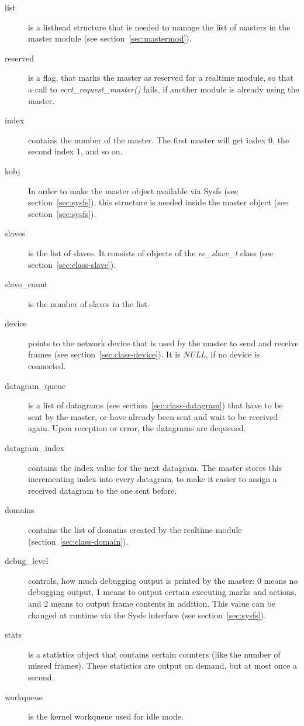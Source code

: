 \documentclass[a4paper,12pt,BCOR6mm,bibtotoc,idxtotoc]{scrbook}
\begin{document}
\begin{description}
\item[list] is a listhead structure that is needed to manage the list
  of masters in the master module (see section~\ref{sec:mastermod}).
\item[reserved] is a flag, that marks the master as reserved for a
  realtime module, so that a call to \textit{ecrt\_request\_master()}
  fails, if another module is already using the master.
\item[index] contains the number of the master. The first master will
  get index 0, the second index 1, and so on.
\item[kobj] In order to make the master object available via Sysfs
  (see section~\ref{sec:sysfs}), this structure is needed inside the
  master object (see section~\ref{sec:sysfs}).
\item[slaves] is the list of slaves. It consists of objects of the
  \textit{ec\_slave\_t} class (see section~\ref{sec:class-slave}).
\item[slave\_count] is the number of slaves in the list.
\item[device] points to the network device that is used by the master
  to send and receive frames (see section~\ref{sec:class-device}). It
  is \textit{NULL}, if no device is connected.
\item[datagram\_queue] is a list of datagrams (see
  section~\ref{sec:class-datagram}) that have to be sent by the
  master, or have already been sent and wait to be received again.
  Upon reception or error, the datagrams are dequeued.
\item[datagram\_index] contains the index value for the next datagram.
  The master stores this incrementing index into every datagram, to
  make it easier to assign a received datagram to the one sent before.
\item[domains] contains the list of domains created by the realtime
  module (section~\ref{sec:class-domain}).
\item[debug\_level] controls, how much debugging output is printed by
  the master: 0 means no debugging output, 1 means to output certain
  executing marks and actions, and 2 means to output frame contents in
  addition. This value can be changed at runtime via the Sysfs
  interface (see section~\ref{sec:sysfs}).
\item[stats] is a statistics object that contains certain counters
  (like the number of missed frames).  These statistics are output on
  demand, but at most once a second.
\item[workqueue] is the kernel workqueue used for idle mode.

\end{description}
\end{document}
